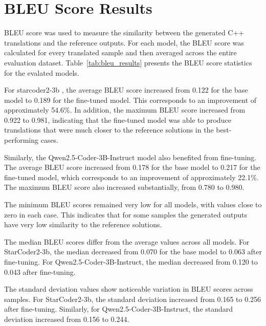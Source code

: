 \section{BLEU Score Results}

BLEU score was used to measure the similarity between the generated C++
translations and the reference outputs. For each model, the BLEU score was
calculated for every translated sample and then averaged across the entire
evaluation dataset. Table~\ref{tab:bleu_results} presents the BLEU score statistics for the evalated models.



For starcoder2-3b , the average BLEU score increased from 0.122 for the base model
to 0.189 for the fine-tuned model. This corresponds to an improvement of
approximately 54.6\%. In addition, the maximum BLEU score increased from 0.922
to 0.981, indicating that the fine-tuned model was able to produce translations
that were much closer to the reference solutions in the best-performing cases.

Similarly, the Qwen2.5-Coder-3B-Instruct model also benefited from fine-tuning. The average BLEU
score increased from 0.178 for the base model to 0.217 for the fine-tuned
model, which corresponds to an improvement of approximately 22.1\%. The maximum
BLEU score also increased substantially, from 0.780 to 0.980.

The minimum BLEU scores remained very low for all models, with values close to
zero in each case. This indicates that for some samples the generated outputs
have very low similarity to the reference solutions.

The median BLEU scores differ from the average values across all models. For
StarCoder2-3b, the median decreased from 0.070 for the base model to 0.063 after
fine-tuning. For Qwen2.5-Coder-3B-Instruct, the median decreased from 0.120 to
0.043 after fine-tuning.

The standard deviation values show noticeable variation in BLEU scores across
samples. For StarCoder2-3b, the standard deviation increased from 0.165 to 0.256
after fine-tuning. Similarly, for Qwen2.5-Coder-3B-Instruct, the standard
deviation increased from 0.156 to 0.244.

\begin{table}[t]
\centering
\caption{BLEU score results for base and fine-tuned models}
\label{tab:bleu_results}
\end{table}
